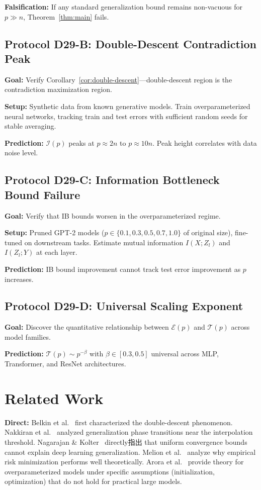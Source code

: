 \documentclass[12pt]{article}
\theoremstyle{definition}
\theoremstyle{remark}
\begin{document}
\textbf{Falsification:} If any standard generalization bound remains non-vacuous for $p \gg n$, Theorem~\ref{thm:main} fails.

\subsection{Protocol D29-B: Double-Descent Contradiction Peak}

\textbf{Goal:} Verify Corollary~\ref{cor:double-descent}---double-descent region is the contradiction maximization region.

\textbf{Setup:} Synthetic data from known generative models. Train overparameterized neural networks, tracking train and test errors with sufficient random seeds for stable averaging.

\textbf{Prediction:} $\mathcal{I}(p)$ peaks at $p \approx 2n$ to $p \approx 10n$. Peak height correlates with data noise level.

\subsection{Protocol D29-C: Information Bottleneck Bound Failure}

\textbf{Goal:} Verify that IB bounds worsen in the overparameterized regime.

\textbf{Setup:} Pruned GPT-2 models ($p \in \{0.1, 0.3, 0.5, 0.7, 1.0\}$ of original size), fine-tuned on downstream tasks. Estimate mutual information $I(X; Z_l)$ and $I(Z_l; Y)$ at each layer.

\textbf{Prediction:} IB bound improvement cannot track test error improvement as $p$ increases.

\subsection{Protocol D29-D: Universal Scaling Exponent}

\textbf{Goal:} Discover the quantitative relationship between $\mathcal{E}(p)$ and $\mathcal{T}(p)$ across model families.

\textbf{Prediction:} $\mathcal{T}(p) \sim p^{-\beta}$ with $\beta \in [0.3, 0.5]$ universal across MLP, Transformer, and ResNet architectures.

\section{Related Work}

\textbf{Direct:} Belkin et al.~\cite{belkin2019reconciling} first characterized the double-descent phenomenon. Nakkiran et al.~\cite{nakkiran2020deep} analyzed generalization phase transitions near the interpolation threshold. Nagarajan \& Kolter~\cite{nagarajan2019uniform} directly指出 that uniform convergence bounds cannot explain deep learning generalization. Melion et al.~\cite{melicon2023gap} analyze why empirical risk minimization performs well theoretically. Arora et al.~\cite{arora2019convergence} provide theory for overparameterized models under specific assumptions (initialization, optimization) that do not hold for practical large models.
\end{document}
